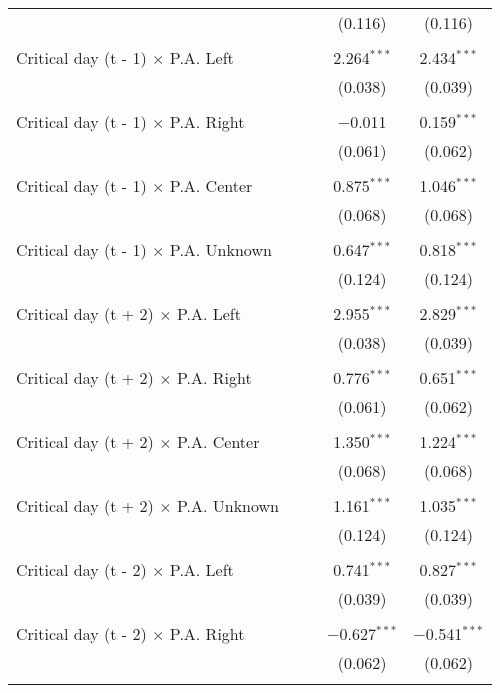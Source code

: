 \documentclass[
]{article}
\begin{document}
\begin{table}[!htbp]
{\begin{tabular}{@{\extracolsep{5pt}}lcccc}
  &  &  & (0.116) & (0.116) \\ 
  & & & & \\ 
 Critical day (t - 1) $\times$ P.A. Left &  &  & 2.264$^{***}$ & 2.434$^{***}$ \\ 
  &  &  & (0.038) & (0.039) \\ 
  & & & & \\ 
 Critical day (t - 1) $\times$ P.A. Right &  &  & $-$0.011 & 0.159$^{***}$ \\ 
  &  &  & (0.061) & (0.062) \\ 
  & & & & \\ 
 Critical day (t - 1) $\times$ P.A. Center &  &  & 0.875$^{***}$ & 1.046$^{***}$ \\ 
  &  &  & (0.068) & (0.068) \\ 
  & & & & \\ 
 Critical day (t - 1) $\times$ P.A. Unknown &  &  & 0.647$^{***}$ & 0.818$^{***}$ \\ 
  &  &  & (0.124) & (0.124) \\ 
  & & & & \\ 
 Critical day (t + 2) $\times$ P.A. Left &  &  & 2.955$^{***}$ & 2.829$^{***}$ \\ 
  &  &  & (0.038) & (0.039) \\ 
  & & & & \\ 
 Critical day (t + 2) $\times$ P.A. Right &  &  & 0.776$^{***}$ & 0.651$^{***}$ \\ 
  &  &  & (0.061) & (0.062) \\ 
  & & & & \\ 
 Critical day (t + 2) $\times$ P.A. Center &  &  & 1.350$^{***}$ & 1.224$^{***}$ \\ 
  &  &  & (0.068) & (0.068) \\ 
  & & & & \\ 
 Critical day (t + 2) $\times$ P.A. Unknown &  &  & 1.161$^{***}$ & 1.035$^{***}$ \\ 
  &  &  & (0.124) & (0.124) \\ 
  & & & & \\ 
 Critical day (t - 2) $\times$ P.A. Left &  &  & 0.741$^{***}$ & 0.827$^{***}$ \\ 
  &  &  & (0.039) & (0.039) \\ 
  & & & & \\ 
 Critical day (t - 2) $\times$ P.A. Right &  &  & $-$0.627$^{***}$ & $-$0.541$^{***}$ \\ 
  &  &  & (0.062) & (0.062) \\ 
  & & & & \\ 

\end{tabular}}
\end{table}
\end{document}
